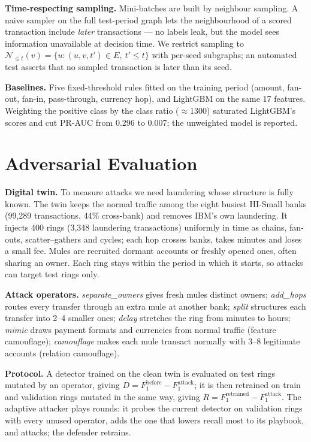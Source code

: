 \documentclass[conference]{IEEEtran}
\begin{document}
\textbf{Time-respecting sampling.} Mini-batches are built by neighbour sampling. A naive sampler on the full test-period graph lets the neighbourhood of a scored transaction include \emph{later} transactions --- no labels leak, but the model sees information unavailable at decision time. We restrict sampling to $\mathcal{N}_{\le t}(v)=\{u:(u,v,t')\in E,\ t'\le t\}$ with per-seed subgraphs; an automated test asserts that no sampled transaction is later than its seed.

\textbf{Baselines.} Five fixed-threshold rules fitted on the training period (amount, fan-out, fan-in, pass-through, currency hop), and LightGBM \cite{ke2017lightgbm} on the same 17 features. Weighting the positive class by the class ratio ($\approx$1300) saturated LightGBM's scores and cut PR-AUC from 0.296 to 0.007; the unweighted model is reported.

\section{Adversarial Evaluation}
\textbf{Digital twin.} To measure attacks we need laundering whose structure is fully known. The twin keeps the normal traffic among the eight busiest HI-Small banks (99,289 transactions, 44\% cross-bank) and removes IBM's own laundering. It injects 400 rings (3,348 laundering transactions) uniformly in time as chains, fan-outs, scatter--gathers and cycles; each hop crosses banks, takes minutes and loses a small fee. Mules are recruited dormant accounts or freshly opened ones, often sharing an owner. Each ring stays within the period in which it starts, so attacks can target test rings only.

\textbf{Attack operators.} \emph{separate\_owners} gives fresh mules distinct owners; \emph{add\_hops} routes every transfer through an extra mule at another bank; \emph{split} structures each transfer into 2--4 smaller ones; \emph{delay} stretches the ring from minutes to hours; \emph{mimic} draws payment formats and currencies from normal traffic (feature camouflage); \emph{camouflage} makes each mule transact normally with 3--8 legitimate accounts (relation camouflage).

\textbf{Protocol.} A detector trained on the clean twin is evaluated on test rings mutated by an operator, giving $D=F_1^{\text{before}}-F_1^{\text{attack}}$; it is then retrained on train and validation rings mutated in the same way, giving $R=F_1^{\text{retrained}}-F_1^{\text{attack}}$. The adaptive attacker \cite{prasetya2025multi} plays rounds: it probes the current detector on validation rings with every unused operator, adds the one that lowers recall most to its playbook, and attacks; the defender retrains.
\end{document}
